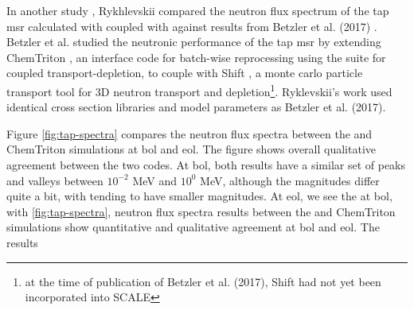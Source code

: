 In another study \cite{rykhlevskii_fuel_2020},
Rykhlevskii compared the neutron flux spectrum of the \Gls{tap} \Gls{msr}
calculated with \SaltProc coupled with \SerpentTWO against results from
Betzler et al. (2017) \cite{betzler_assessment_2017}. Betzler et al. studied the
neutronic performance of the \Gls{tap} \Gls{msr} by extending ChemTriton
\cite{betzler_molten_2017}, an interface code for batch-wise reprocessing
using the \SCALE suite for coupled transport-depletion, to couple with Shift
\cite{davidson_nuclide_2018}, a monte carlo particle transport tool for 3D
neutron transport and depletion\footnote{at the time of publication of Betzler
et al. (2017), Shift had not yet been incorporated into SCALE}.
Ryklevskii's work used identical cross section libraries and model parameters as
Betzler et al. (2017).

Figure \ref{fig:tap-spectra} compares the neutron flux spectra between the
\SaltProc and ChemTriton simulations at \Gls{bol} and \gls{eol}. The
figure shows overall qualitative agreement between the two codes. At \Gls{bol},
both results have a similar set of peaks and valleys between $10^{-2}$ MeV and
$10^{0}$ MeV, although the magnitudes differ quite a bit, with \SaltProc
tending to have smaller magnitudes. At \Gls{eol}, we see the 
at \Gls{bol}, with 
\ref{fig:tap-spectra}, neutron flux spectra results between the \SaltProc and
ChemTriton simulations show quantitative and qualitative agreement at 
\Gls{bol} and \Gls{eol}. The \SaltProc results

